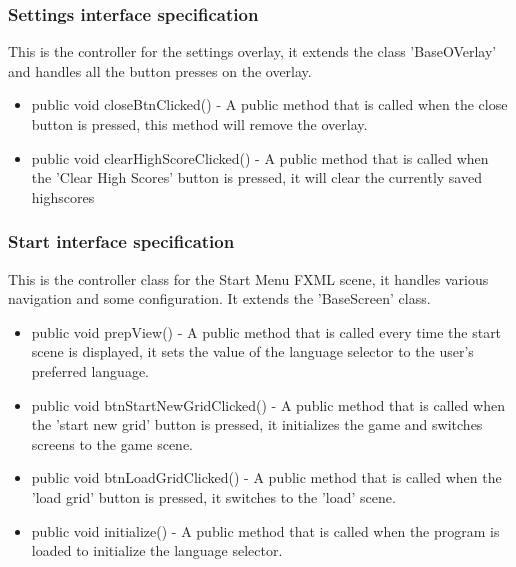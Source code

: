         \subsubsection{Settings interface specification}
        	This is the controller for the settings overlay, it extends the class 'BaseOVerlay' and handles all the button presses on the overlay.
            \begin{itemize}
            	\item public void closeBtnClicked() - A public method that is called when the close button is pressed, this method will remove the overlay.
                \item public void clearHighScoreClicked() - A public method that is called when the 'Clear High Scores' button is pressed, it will clear the currently saved highscores 
            \end{itemize}

        \subsubsection{Start interface specification}
        	This is the controller class for the Start Menu FXML scene, it handles various navigation and some configuration. It extends the 'BaseScreen' class.
            \begin{itemize}
            	\item public void prepView() - A public method that is called every time the start scene is displayed, it sets the value of the language selector to the user's preferred language.
                \item public void btnStartNewGridClicked() - A public method that is called when the 'start new grid' button is pressed, it initializes the game and switches screens to the game scene.
                \item public void btnLoadGridClicked() - A public method that is called when the 'load grid' button is pressed, it switches to the 'load' scene.
                \item public void initialize() - A public method that is called when the program is loaded to initialize the language selector.
            \end{itemize}